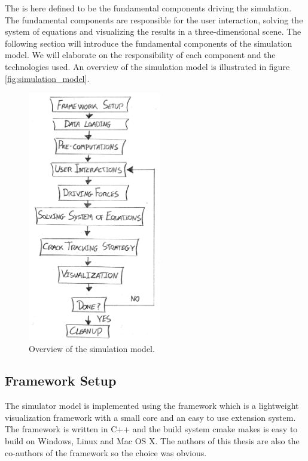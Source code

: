 
The  is here defined to be the fundamental components
driving the simulation. The fundamental components are responsible for
the user interaction, solving the system of equations and visualizing
the results in a three-dimensional scene. 
The following section will introduce the fundamental components of the
simulation model. We will elaborate on the responsibility of each component
and the technologies used.
%
An overview of the simulation model is illustrated in figure
\vref{fig:simulation_model}.  

\begin{figure}
  \centering
  \includegraphics[width=5.8cm]{./images/simulation_model.png}
\caption{Overview of the simulation model.}
\label{fig:simulation_model}
\end{figure}

\subsection*{Framework Setup}
The simulator model is implemented using the
\openengine{} framework
which is a lightweight visualization framework with a small core and
an easy to use extension system. The framework is written
in C++ and the build system
cmake makes is easy to build on Windows,
Linux and Mac OS X. The authors of this thesis are also the co-authors of
the \openengine{} framework so the choice was obvious. \\
 

